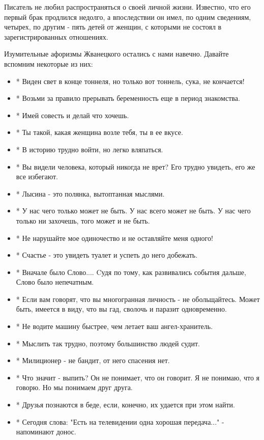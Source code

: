 Писатель не любил распространяться о своей личной жизни. Известно, что его
первый брак продлился недолго, а впоследствии он имел, по одним сведениям,
четырех, по другим - пять детей от женщин, с которыми не состоял в
зарегистрированных отношениях.

Изумительные афоризмы Жванецкого остались с нами навечно. Давайте вспомним
некоторые из них:

\begin{itemize}
\item * Виден свет в конце тоннеля, но только вот тоннель, сука, не кончается!
\item * Возьми за правило прерывать беременность еще в период знакомства.
\item * Имей совесть и делай что хочешь.
\item * Ты такой, какая женщина возле тебя, ты в ее вкусе.
\item * В историю трудно войти, но легко вляпаться.
\item * Вы видели человека, который никогда не врет? Его трудно увидеть, его
же все избегают.
\item * Лысина - это полянка, вытоптанная мыслями.
\item * У нас чего только может не быть. У нас всего может не быть. У нас чего
только ни захочешь, того может и не быть.
\item * Не нарушайте мое одиночество и не оставляйте меня одного!
\item * Счастье - это увидеть туалет и успеть до него добежать.
\item * Вначале было Слово.... Cудя по тому, как развивались события дальше,
Слово было непечатным.
\item * Если вам говорят, что вы многогранная личность - не обольщайтесь.
Может быть, имеется в виду, что вы гад, сволочь и паразит
одновременно.
\item * Не водите машину быстрее, чем летает ваш ангел-хранитель.
\item * Мыслить так трудно, поэтому большинство людей судит.
\item * Милиционер - не бандит, от него спасения нет.
\item * Что значит - выпить? Он не понимает, что он говорит. Я не понимаю, что
я говорю. Но мы понимаем друг друга.
\item * Друзья познаются в беде, если, конечно, их удается при этом найти.
\item * Сегодня слова: "Есть на телевидении одна хорошая передача..." -
напоминают донос.

\end{itemize}
